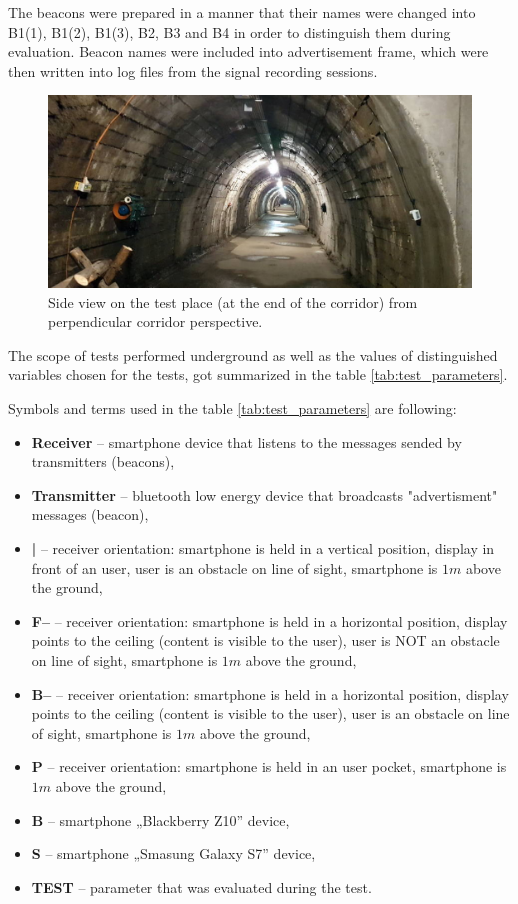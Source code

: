 \documentclass[../main.tex]{subfiles}
\begin{document}
The beacons were prepared in a manner that their names were changed into B1(1), B1(2), B1(3), B2, B3 and B4 in order to distinguish them during evaluation. Beacon names were included into advertisement frame, which were then written into log files from the signal recording sessions.

\begin{figure}[!htbp]
\includegraphics[width=\textwidth, keepaspectratio]{pictures/tests_corridor_general.pdf}
\centering
\caption{Side view on the test place (at the end of the corridor) from perpendicular corridor perspective.}
\label{fig:tests_corridor_genera}
\end{figure}


The scope of tests performed underground as well as the values of distinguished variables chosen for the tests, got summarized in the table \ref{tab:test_parameters}.

Symbols and terms used in the table \ref{tab:test_parameters} are following:
\begin{itemize}
	\item \textbf{Receiver} -- smartphone device that listens to the messages sended by transmitters (beacons),
	\item \textbf{Transmitter} -- bluetooth low energy device that broadcasts "advertisment" messages (beacon),
	\item \textbf{|} -- receiver orientation: smartphone is held in a vertical position, display in front of an user, user is an obstacle on line of sight, smartphone is $1m$ above the ground,
	\item \textbf{F--} --	receiver orientation: smartphone is held in a horizontal position, display points to the ceiling (content is visible to the user), user is NOT an obstacle on line of sight, smartphone is $1m$ above the ground,
	\item \textbf{B--} --	receiver orientation: smartphone is held in a horizontal position, display points to the ceiling (content is visible to the user), user is an obstacle on line of sight, smartphone is $1m$ above the ground,
	\item \textbf{P}	-- receiver orientation: smartphone is held in an user pocket, smartphone is $1m$ above the ground,
	\item \textbf{B}	-- smartphone „Blackberry Z10” device,
	\item \textbf{S}	-- smartphone „Smasung Galaxy S7” device,
	\item \textbf{TEST} -- parameter that was evaluated during the test.
\end{itemize}
\end{document}
